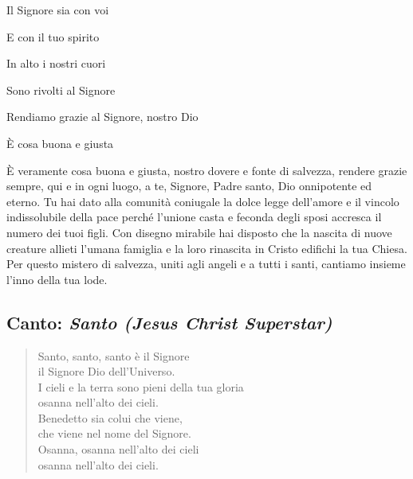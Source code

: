 	\begin{dialoghi}
		\item[\sacerdote] Il Signore sia con voi
		\item[\assemblea] E con il tuo spirito
		\item[\sacerdote] In alto i nostri cuori
		\item[\assemblea] Sono rivolti al Signore
		\item[\sacerdote] Rendiamo grazie al Signore, nostro Dio
		\item[\assemblea] È cosa buona e giusta
		\item[\sacerdote] È veramente cosa buona e giusta, nostro dovere e fonte di salvezza, rendere grazie sempre, qui e in ogni luogo, a te, Signore, Padre santo, Dio onnipotente ed eterno. Tu hai dato alla comunità coniugale la dolce legge dell'amore e il vincolo indissolubile della pace perché l'unione casta e feconda degli sposi accresca il numero dei tuoi figli. Con disegno mirabile hai disposto che la nascita di nuove creature allieti l'umana famiglia e la loro rinascita in Cristo edifichi la tua Chiesa. Per questo mistero di salvezza, uniti agli angeli e a tutti i santi, cantiamo insieme l'inno della tua lode.
	\end{dialoghi}

\subsection*{Canto: \textit{Santo (Jesus Christ Superstar)}}

	\begin{verse}
		\begin{mystrofe}
		Santo, santo, santo è il Signore \\
		il Signore Dio dell'Universo. \\
		I cieli e la terra sono pieni della tua gloria \\
		osanna nell'alto dei cieli. \\
		Benedetto sia colui che viene, \\
		che viene nel nome del Signore. \\
		Osanna, osanna nell'alto dei cieli \\
		osanna nell'alto dei cieli.
		\end{mystrofe}
	\end{verse}

